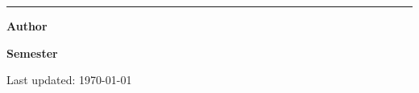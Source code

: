 \begin{titlepage}
  \vspace{0.6cm}
  {\raggedright
    \large \color{v-ink!85}\Tagline\par
  }

  \vfill
  \vspace{1.1cm}
  {\rule{\textwidth}{0.9pt}}

  \noindent
  \begin{minipage}[t]{0.5\textwidth}
    \raggedright
    {\color{v-primary}\sffamily\bfseries Author}\par\vspace{0.25cm}
    {\Large \sffamily \AuthorName}\par
    \vspace{0.2cm}
    {\sffamily \small \href{mailto:\AuthorEmail}{\AuthorEmail}}
  \end{minipage}%
  \begin{minipage}[t]{0.5\textwidth}
    \raggedleft
    {\color{v-primary}\sffamily\bfseries Semester}\par\vspace{0.25cm}
    {\Large \sffamily \Semester}\par
    \vspace{0.2cm}
    {\sffamily \small Last updated: \today}
  \end{minipage}

\end{titlepage}